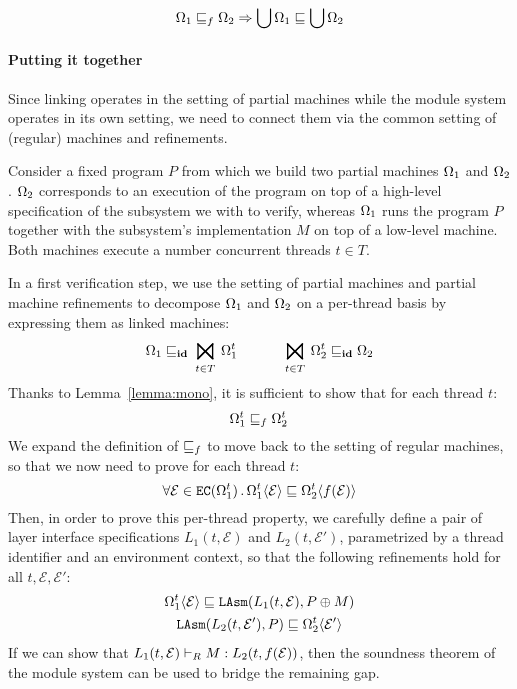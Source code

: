 \begin{lemma}
\[ \Omega_1 \sqsubseteq_f \Omega_2 \Rightarrow \bigcup \Omega_1 \sqsubseteq \bigcup \Omega_2 \]
\end{lemma}

\paragraph{Putting it together}
Since linking operates in the setting of partial machines
while the module system operates in its own setting,
we need to connect them
via the common setting of (regular) machines and refinements.

Consider a fixed program $P$
from which we build two partial machines $\Omega_1$ and $\Omega_2$.
$\Omega_2$ corresponds to an execution of the program
on top of a high-level specification of the subsystem
we with to verify,
whereas $\Omega_1$ runs the program $P$ together with the subsystem's implementation $M$
on top of a low-level machine.
Both machines execute a number concurrent threads $t \in T$.

In a first verification step,
we use the setting of partial machines and partial machine refinements to 
decompose $\Omega_1$ and $\Omega_2$ on a per-thread basis
by expressing them as linked machines:
\[
	\Mach_1 \refines_\id \bigJoin_{t \in T} \Mach_1^t  \hspace{3em}
	\bigJoin_{t \in T} \Mach_2^t \refines_\id \Mach_2
\]
Thanks to Lemma~\ref{lemma:mono},
it is sufficient to show that for each thread $t$:
\[
		\Omega_1^t \sqsubseteq_f \Omega_2^t \,
\]
We expand the definition of $\sqsubseteq_f$
to move back to the setting of regular machines,
so that we now need to prove for each thread $t$:
\[
	\forall \mathcal{E} \in {{{\texttt{EC}}}({\Omega_1^t})}\,.\,
		\Omega_1^t \langle \mathcal{E} \rangle \sqsubseteq
		\Omega_2^t \langle f(\mathcal{E}) \rangle
\]
Then, in order to prove this per-thread property,
we carefully define a pair of layer interface specifications
$L_1(t, \mathcal{E})$ and $L_2(t, \mathcal{E}')$,
parametrized by a thread identifier and an environment context,
so that the following refinements hold for all $t, \mathcal{E}, \mathcal{E}'$:
\begin{gather*}
	\Omega_1^t \langle \mathcal{E} \rangle \sqsubseteq {{\texttt{LAsm}}}(L_1(t, \mathcal{E}), P \oplus M) \\
	{{\texttt{LAsm}}}(L_2(t, \mathcal{E}'), P) \sqsubseteq \Omega_2^t \langle \mathcal{E}' \rangle
\end{gather*}
If we can show that
$ L_1(t, \mathcal{E}) \vdash_{R} M : L_2(t, f(\mathcal{E})) $,
then the soundness theorem of the module system
can be used to bridge the remaining gap.


